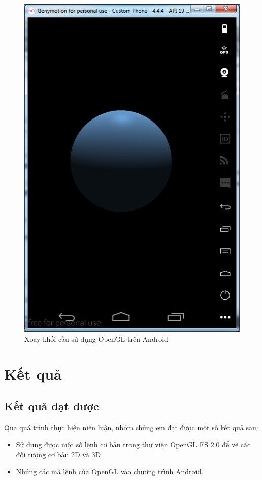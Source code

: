 \documentclass[13pt,a4paper]{extreport}
\begin{document}
\begin{itemize}
\begin{figure}[!h]
\begin{center}
					\includegraphics[scale=.6]{opengles-circle-2.png}
				\end{center}
				\caption{Xoay khối cầu sử dụng OpenGL trên Android}
				\label{Fig:opengles-circle}
			\end{figure}		
	\end{itemize}

\chapter{Kết quả}
\section{Kết quả đạt được}
	Qua quá trình thực hiện niên luận, nhóm chúng em đạt được một số kết quả sau:
		\begin{itemize}
			\item Sử dụng được một số lệnh cơ bản trong thư viện OpenGL ES 2.0 để vẽ các đối tượng cơ bản 2D và 3D.
			
			\item Nhúng các mã lệnh của OpenGL vào chương trình Android.
		\end{itemize}
\end{document}
